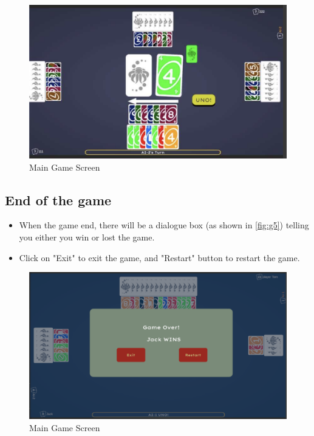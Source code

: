 \documentclass[12pt, titlepage]{article}
\begin{document}
\begin{figure}[h]
    \centering
    \includegraphics[scale=0.6]{Game_Screen.png}
    \caption{Main Game Screen}
    \label{fig:g4}
\end{figure}


\subsection{End of the game}
\begin{itemize}
    \item When the game end, there will be a dialogue box (as shown in \autoref{fig:g5}) telling you either you win or lost the game.
    \item Click on "Exit" to exit the game, and "Restart" button to restart the game.
\end{itemize}

\begin{figure}[h]
    \centering
    \includegraphics[scale=0.55]{Game_over.png}
    \caption{Main Game Screen}
    \label{fig:g5}
\end{figure}
\end{document}
